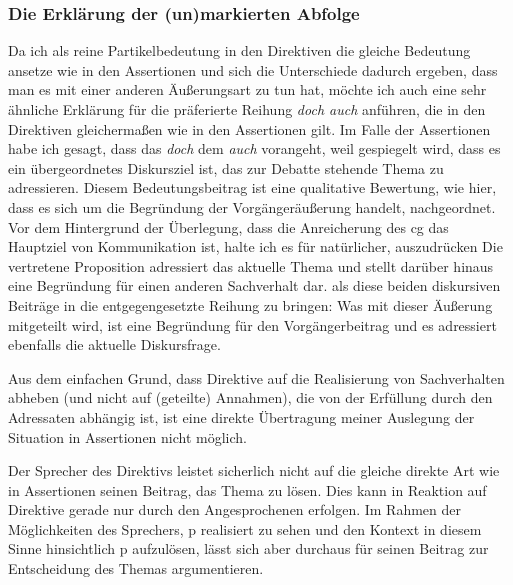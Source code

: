 {\subsubsection{Die Erklärung der (un)markierten Abfolge}
Da ich als reine Partikelbedeutung in den Direktiven die gleiche Bedeutung ansetze wie in den Assertionen und sich die Unterschiede dadurch ergeben, dass man es mit einer anderen Äußerungsart zu tun hat, möchte ich auch eine sehr ähnliche Erklärung für die präferierte Reihung \textit{doch auch} anführen, die in den Direktiven gleichermaßen wie in den Assertionen gilt. Im Falle der Assertionen habe ich gesagt, dass das \textit{doch} dem \textit{auch} vorangeht, weil gespiegelt wird, dass es ein übergeordnetes Diskursziel ist, das zur Debatte stehende Thema zu adressieren. Diesem Bedeutungsbeitrag ist eine qualitative Bewertung, wie hier, dass es sich um die Begründung der Vorgängeräußerung handelt, nachgeordnet. Vor dem Hintergrund der Überlegung, dass die Anreicherung des cg das Hauptziel von Kommunikation ist, halte ich es für natürlicher, auszudrücken \glq Die vertretene Proposition adressiert das aktuelle Thema und stellt darüber hinaus eine Begründung für einen anderen Sachverhalt dar.\grq {} als diese beiden diskursiven Beiträge in die entgegengesetzte Reihung zu bringen: \glq Was mit dieser Äußerung mitgeteilt wird, ist eine Begründung für den Vorgängerbeitrag und es adressiert ebenfalls die aktuelle Diskursfrage.\grq {}

Aus dem einfachen Grund, dass Direktive auf die Realisierung von Sachverhalten abheben (und nicht auf (geteilte) Annahmen), die von der Erfüllung durch den Adressaten abhängig ist, ist eine direkte Übertragung meiner Auslegung der Situation in Assertionen nicht möglich. 

Der Sprecher des Direktivs leistet sicherlich nicht auf die gleiche direkte Art wie in Assertionen seinen Beitrag, das Thema zu lösen. Dies kann in Reaktion auf Direktive gerade nur durch den Angesprochenen erfolgen. Im Rahmen der Möglichkeiten des Sprechers, p realisiert zu sehen und den Kontext in diesem Sinne hinsichtlich p aufzulösen, lässt sich aber durchaus für seinen Beitrag zur Entscheidung des Themas argumentieren. 

}
